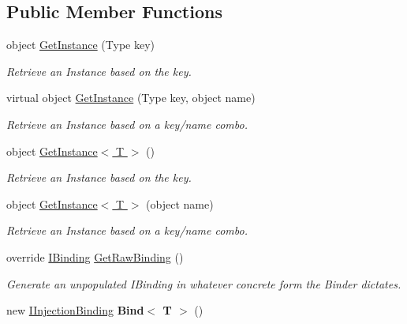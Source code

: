 \subsection*{Public Member Functions}
\begin{DoxyCompactItemize}
\item 
object \hyperlink{classstrange_1_1extensions_1_1injector_1_1impl_1_1_injection_binder_a30a3ddff299d4a86a26e3fd58b4ca68e}{Get\-Instance} (Type key)
\begin{DoxyCompactList}\small\item\em Retrieve an Instance based on the key. \end{DoxyCompactList}\item 
virtual object \hyperlink{classstrange_1_1extensions_1_1injector_1_1impl_1_1_injection_binder_af695f0c65ded51228d02afc0374bacd5}{Get\-Instance} (Type key, object name)
\begin{DoxyCompactList}\small\item\em Retrieve an Instance based on a key/name combo. \end{DoxyCompactList}\item 
object \hyperlink{classstrange_1_1extensions_1_1injector_1_1impl_1_1_injection_binder_aab0163fc0ce29c87ce23e05b33941550}{Get\-Instance$<$ T $>$} ()
\begin{DoxyCompactList}\small\item\em Retrieve an Instance based on the key. \end{DoxyCompactList}\item 
object \hyperlink{classstrange_1_1extensions_1_1injector_1_1impl_1_1_injection_binder_a1cd9b99f05837f13f0dbc2e47e603faa}{Get\-Instance$<$ T $>$} (object name)
\begin{DoxyCompactList}\small\item\em Retrieve an Instance based on a key/name combo. \end{DoxyCompactList}\item 
\hypertarget{classstrange_1_1extensions_1_1injector_1_1impl_1_1_injection_binder_a06ef3bfc85a8c3cb79a115a7b9247c3e}{override \hyperlink{interfacestrange_1_1framework_1_1api_1_1_i_binding}{I\-Binding} \hyperlink{classstrange_1_1extensions_1_1injector_1_1impl_1_1_injection_binder_a06ef3bfc85a8c3cb79a115a7b9247c3e}{Get\-Raw\-Binding} ()}\label{classstrange_1_1extensions_1_1injector_1_1impl_1_1_injection_binder_a06ef3bfc85a8c3cb79a115a7b9247c3e}

\begin{DoxyCompactList}\small\item\em Generate an unpopulated I\-Binding in whatever concrete form the Binder dictates. \end{DoxyCompactList}\item 
\hypertarget{classstrange_1_1extensions_1_1injector_1_1impl_1_1_injection_binder_a225ef5012c33e46aab59ee7f680a7fc5}{new \hyperlink{interfacestrange_1_1extensions_1_1injector_1_1api_1_1_i_injection_binding}{I\-Injection\-Binding} {\bfseries Bind$<$ T $>$} ()}\label{classstrange_1_1extensions_1_1injector_1_1impl_1_1_injection_binder_a225ef5012c33e46aab59ee7f680a7fc5}


\end{DoxyCompactItemize}
